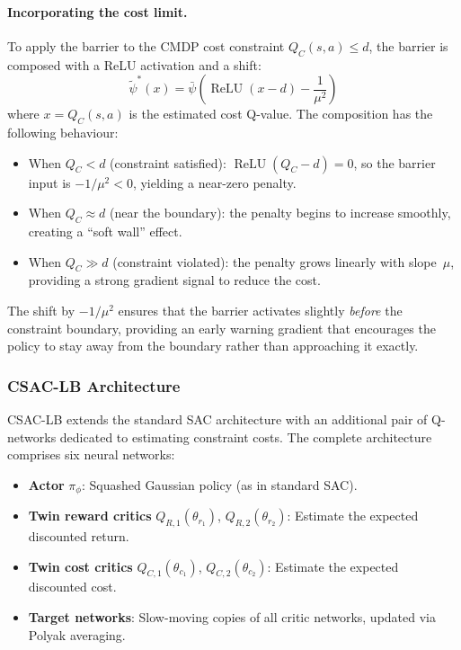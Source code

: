 \paragraph{Incorporating the cost limit.}
To apply the barrier to the CMDP cost constraint $Q_C(s,a) \leq d$, the
barrier is composed with a ReLU activation and a shift:
\begin{equation}
  \tilde{\psi}^*(x) = \bar{\psi}\!\left(
    \operatorname{ReLU}(x - d) - \frac{1}{\mu^2}
  \right)
  \label{eq:barrier-shifted}
\end{equation}
where $x = Q_C(s,a)$ is the estimated cost Q-value.  The composition has the
following behaviour:
\begin{itemize}
  \item When $Q_C < d$ (constraint satisfied): $\operatorname{ReLU}(Q_C - d) = 0$,
    so the barrier input is $-1/\mu^2 < 0$, yielding a near-zero penalty.
  \item When $Q_C \approx d$ (near the boundary): the penalty begins to
    increase smoothly, creating a ``soft wall'' effect.
  \item When $Q_C \gg d$ (constraint violated): the penalty grows linearly
    with slope~$\mu$, providing a strong gradient signal to reduce the cost.
\end{itemize}
The shift by $-1/\mu^2$ ensures that the barrier activates slightly
\emph{before} the constraint boundary, providing an early warning gradient
that encourages the policy to stay away from the boundary rather than
approaching it exactly.

\subsubsection{CSAC-LB Architecture}

CSAC-LB extends the standard SAC architecture with an additional pair of
Q-networks dedicated to estimating constraint costs.  The complete architecture
comprises six neural networks:

\begin{itemize}
  \item \textbf{Actor} $\pi_\phi$: Squashed Gaussian policy (as in standard SAC).
  \item \textbf{Twin reward critics} $Q_{R,1}(\theta_{r_1})$,
    $Q_{R,2}(\theta_{r_2})$: Estimate the expected discounted return.
  \item \textbf{Twin cost critics} $Q_{C,1}(\theta_{c_1})$,
    $Q_{C,2}(\theta_{c_2})$: Estimate the expected discounted cost.
  \item \textbf{Target networks}: Slow-moving copies of all critic networks,
    updated via Polyak averaging.
\end{itemize}

